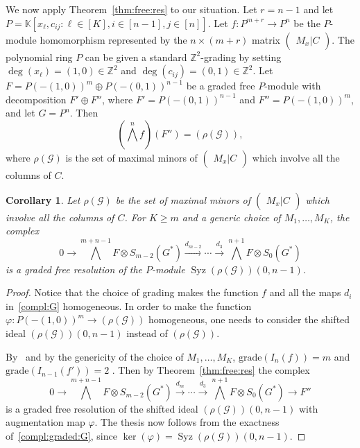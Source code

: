 \documentclass[utf8,latin1]{article}
\newtheorem{corollary}[theorem]{Corollary}
\DeclareMathOperator{\Syz}{Syz}
\newcommand{\KK}{\mathbb{K}}
\newcommand{\ZZ}{\mathbb{Z}}
\begin{document}
We now apply Theorem~\ref{thm:free:res} to our situation. Let $r=n-1$ and let $P=\KK[x_{\ell},c_{ij}: \ell\in[K], i\in[n-1], j\in[n]]$. Let $f:P^{m+r} \rightarrow P^n$ be the $P$-module homomorphism represented by the $n \times (m+r)$ matrix
$\begin{pmatrix}
M_x \lvert C
\end{pmatrix}$.
The polynomial ring $P$ can be given a standard $\ZZ^2$-grading by setting $\deg(x_{\ell})=(1,0) \in \ZZ^2$ and $\deg(c_{ij})=(0,1) \in \ZZ^2$. 
Let $F=P(-(1,0))^{m} \oplus P(-(0,1))^{n-1}$ be a graded free $P$-module with decomposition $F' \oplus F''$, where $F'=P(-(0,1))^{n-1}$ and $F''=P(-(1,0))^{m}$, and let $G=P^n$. Then $$\left(\bigwedge^n f\right)(F'') = (\rho(\mathcal{G})),$$
where $\rho(\mathcal{G})$ is the set of maximal minors of $\begin{pmatrix}
M_x \lvert C
\end{pmatrix}$ which involve all the columns of $C$.

\begin{corollary}\label{lemma:free:res:Syz:G}
Let $\rho(\mathcal{G})$ be the set of maximal minors of $\begin{pmatrix}
M_x \lvert C
\end{pmatrix}$ which involve all the columns of $C$.
For $K\geq m$ and a generic choice of $M_1,\ldots,M_K$, the complex 
\begin{equation} \label{compl:graded:syzG}
0 \rightarrow \bigwedge^{m+n-1} F \otimes S_{m-2}(G^{*}) \xrightarrow{d_{m-2}} \cdots \xrightarrow{d_3} \bigwedge^{n+1} F \otimes S_{0}(G^{*}) 
\end{equation}
is a graded free resolution of the $P$-module $\Syz(\rho(\mathcal{G}))(0,n-1)$.
\end{corollary}

\begin{proof}
Notice that the choice of grading makes the function $f$ and all the maps $d_i$ in~\eqref{compl:G} homogeneous. In order to make the function $\varphi: P(-(1,0))^{m} \rightarrow (\rho(\mathcal{G}))$ homogeneous, one needs to consider the shifted ideal $(\rho(\mathcal{G}))(0,n-1)$ instead of $(\rho(\mathcal{G}))$. 

By~\cite[Theorem 2.5]{BV88} and by the genericity of the choice of $M_1,\ldots,M_K$, $\mathrm{grade}(I_n(f))=m$ and $\mathrm{grade}(I_{n-1}(f'))=2$ . Then by Theorem~\ref{thm:free:res} the complex 
\begin{equation} \label{compl:graded:G}
0 \rightarrow \bigwedge^{m+n-1} F \otimes S_{m-2}(G^{*}) \xrightarrow{d_{m}} \cdots \xrightarrow{d_3} \bigwedge^{n+1} F \otimes S_{0}(G^{*}) \rightarrow F'' 
\end{equation}
is a graded free resolution of the shifted ideal $(\rho(\mathcal{G}))(0,n-1)$ with augmentation map $\varphi$.  
The thesis now follows from the exactness of~\eqref{compl:graded:G}, since $\ker(\varphi)=\Syz(\rho(\mathcal{G}))(0,n-1)$.
\end{proof}
\end{document}
